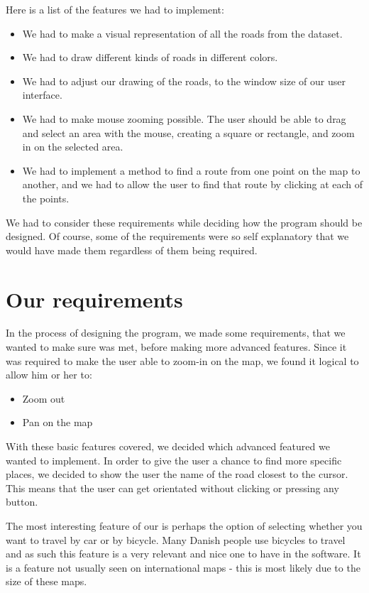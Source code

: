Here is a list of the features we had to implement: 
\begin{itemize}
  \item We had to make a visual representation of all the roads from the
  dataset.
  \item We had to draw different kinds of roads in different colors.
  \item We had to adjust our drawing of the roads, to the window size of our
  user interface.
  \item We had to make mouse zooming possible.  The user should be able to drag
  and select an area with the mouse, creating a square or rectangle, and zoom in on the
  selected area.
  \item We had to implement a method to find a route from one point on the map to
  another, and we had to allow the user to find that route by clicking at each
  of the points.
\end{itemize}
We had to consider these requirements while
deciding how the program should be designed. Of course, some of the
requirements were so self explanatory that we would have made them regardless
of them being required.

\section{Our requirements}
In the process of designing the program, we made some requirements, that we
wanted to make sure was met, before making more advanced features. Since it was
required to make the user able to zoom-in on the map, we found it logical to
allow him or her to:
\begin{itemize}
  \item Zoom out
  \item Pan on the map
\end{itemize}

With these basic features covered, we decided which advanced featured we wanted
to implement. In order to give the user a chance to find more specific places, we
decided to show the user the name of the road closest to the cursor. This means
that the user can get orientated without clicking or pressing any button. 

The most interesting feature of our  is perhaps the
option of selecting whether you want to travel by car or by bicycle. Many Danish
people use bicycles to travel and as such this feature is a very relevant and
nice one to have in the software. It is a feature not usually seen on
international maps - this is most likely due to the size of these maps.

